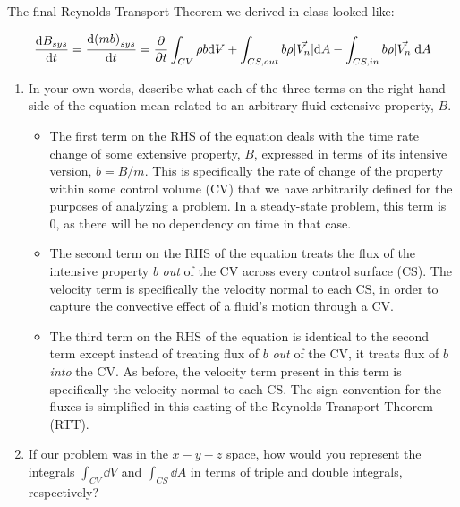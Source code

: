 \documentclass[../main.tex]{subfiles}
\begin{document}

The final Reynolds Transport Theorem we derived in class looked like:

\begin{equation*}
    \frac{\dd B_{sys}}{\dd t} = %
    \frac{\dd (mb)_{sys}}{\dd t} = %
    \pdv{t} \int_{CV} \rho b \dd \volume +%
    \int_{CS,out} b \rho \lvert{\vec{V_n}}\rvert \dd A -%
    \int_{CS,in} b \rho \lvert{\vec{V_n}}\rvert \dd A
\end{equation*}

\begin{enumerate}[label = (\alph*)]

    \item In your own words, describe what each of the three terms on the right-hand-side of the equation mean related to an arbitrary fluid extensive property, $B$.

        \begin{itemize}

            \item The first term on the RHS of the equation deals with the time rate change of some extensive property, $B$, expressed in terms of its intensive version, $b = B/m$.
            This is specifically the rate of change of the property within some control volume (CV) that we have arbitrarily defined for the purposes of analyzing a problem.
            In a steady-state problem, this term is 0, as there will be no dependency on time in that case.
            \item The second term on the RHS of the equation treats the flux of the intensive property $b$ \textit{out} of the CV across every control surface (CS).
            The velocity term is specifically the velocity normal to each CS, in order to capture the convective effect of a fluid's motion through a CV.
            \item The third term on the RHS of the equation is identical to the second term except instead of treating flux of $b$ \textit{out} of the CV, it treats flux of $b$ \textit{into} the CV.
            As before, the velocity term present in this term is specifically the velocity normal to each CS. 
            The sign convention for the fluxes is simplified in this casting of the Reynolds Transport Theorem (RTT).

        \end{itemize}

    \item If our problem was in the $x-y-z$ space, how would you represent the integrals \(\int_{CV} \dd V\) and \(\int_{CS} \dd A\) in terms of triple and double integrals, respectively?
    

\end{enumerate}
\end{document}

